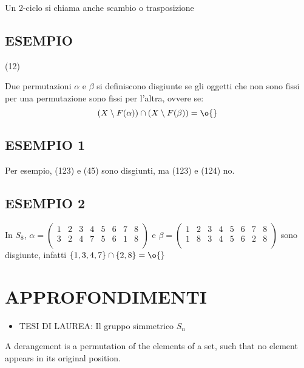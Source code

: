\begin{definizione}
Un 2-ciclo si chiama anche scambio o trasposizione
\end{definizione}

\subsection{ESEMPIO}
(12)

\begin{definizione}
Due permutazioni $\alpha$ e $\beta$ si definiscono disgiunte se gli oggetti che non sono fissi per una permutazione
sono fissi per l'altra, ovvere se:
\[
 (X \setminus F(\alpha))\cap (X \setminus F(\beta))=\o{}
\]
\end{definizione}

\subsection{ESEMPIO 1}
Per esempio, (123) e (45) sono disgiunti, ma (123) e (124) no. 

\subsection{ESEMPIO 2}
In $S_{8}$, $\alpha = \left( \begin{array}{cccccccc} 1 & 2 & 3 & 4 & 5 & 6 & 7 & 8 \\ 3 & 2 & 4 & 7 & 5 & 6 & 1 & 8 \\ \end{array} \right)$
e $\beta = \left( \begin{array}{cccccccc} 1 & 2 & 3 & 4 & 5 & 6 & 7 & 8 \\ 1 & 8 & 3 & 4 & 5 & 6 & 2 & 8 \\ \end{array} \right)$
sono disgiunte, infatti $\{ 1,3,4,7 \} \cap \{ 2,8 \} = \o{}$

\section{APPROFONDIMENTI}
\begin{itemize}
 \item TESI DI LAUREA: Il gruppo simmetrico $S_{n}$ 
\end{itemize}

\begin{definizione}[Derangement]
A derangement is a permutation of the elements of a set, such that no element appears in its original 
position. 
\end{definizione}


